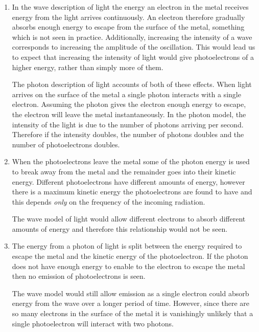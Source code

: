 \documentclass[revision-guide.tex]{subfiles}
\begin{document}
\begin{enumerate}[label=\emph{(\alph*)}]
\item In the wave description of light the energy an electron in the metal receives energy from the light arrives continuously. An electron  therefore gradually absorbs enough energy to escape from the surface of the metal, something which is not seen in practice. Additionally, increasing the intensity of a wave corresponds to increasing the amplitude of the oscillation. This would lead us to expect that increasing the intensity of light would give photoelectrons of a higher energy, rather than simply more of them.

The photon description of light accounts of both of these effects. When light arrives on the surface of the metal a single photon interacts with a single electron. Assuming the photon gives the electron enough energy to escape, the electron will leave the metal instantaneously. In the photon model, the intensity of the light is due to the number of photons arriving per second. Therefore if the intensity doubles, the number of photons doubles and the number of photoelectrons doubles.

\item When the photoelectrons leave the metal some of the photon energy is used to break away from the metal and the remainder goes into their kinetic energy. Different photoelectrons have different amounts of energy, however there is a maximum kinetic energy the photoelectrons are found to have and this depends \emph{only} on the frequency of the incoming radiation.

The wave model of light would allow different electrons to absorb different amounts of energy and therefore this relationship would not be seen.

\item The energy from a photon of light is split between the energy required to escape the metal and the kinetic energy of the photoelectron. If the photon does not have enough energy to enable to the electron to escape the metal then no emission of photoelectrons is seen.

The wave model would still allow emission as a single electron could absorb energy from the wave over a longer period of time. However, since there are so many electrons in the surface of the metal it is vanishingly unlikely that a single photoelectron will interact with two photons.

\end{enumerate}
\end{document}
